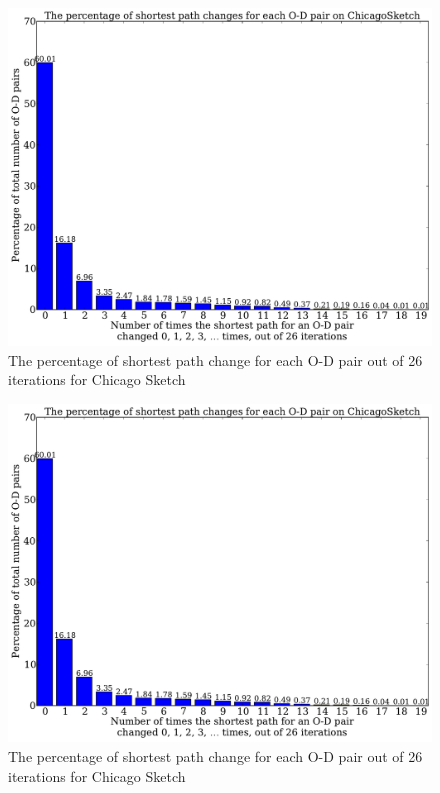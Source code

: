 \begin{figure}[H]
    \centering
    \includegraphics[page=1, height=.5\textheight]{img/sp_change}
    \caption{The percentage of shortest path change for each O-D pair out of 26 iterations for Chicago Sketch}
    \label{fig:sp_change}
\end{figure}
\begin{figure}[H]
    \centering
    \includegraphics[page=2, height=.5\textheight]{img/sp_change}
    \caption{The percentage of shortest path change for each O-D pair out of 26 iterations for Chicago Sketch}
    \label{fig:sp_change2}
\end{figure}

